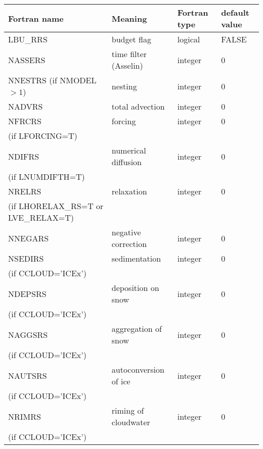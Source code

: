 \begin{center}
\begin{tabular} {|p{8cm}|p{4cm}|>{\centering}p{1.5cm}|p{1.5cm}<{\centering}|}
\hline
Fortran name & Meaning & Fortran type & default value \\
\hline\hline
LBU\_RRS & budget flag & logical & FALSE\index{LBU\_RRS!\innam{NAM\_BU\_RRS}} \\\hline
NASSERS  & time filter (Asselin)   & integer  &  0 \index{NASSERS!\innam{NAM\_BU\_RRS}} \\\hline
NNESTRS (if NMODEL$>1$) & nesting           & integer  &  0 \index{NNESTRS!\innam{NAM\_BU\_RRS}} \\\hline
NADVRS   & total advection   & integer  &  0 \index{NADVRS!\innam{NAM\_BU\_RTH}}\\\hline
NFRCRS   & forcing           & integer  &  0 \index{NFRCRS!\innam{NAM\_BU\_RRS}} \\
(if LFORCING=T) &  &   &   \\\hline
NDIFRS   & numerical diffusion & integer  &  0 \index{NDIFRS!\innam{NAM\_BU\_RRS}} \\
(if LNUMDIFTH=T) &  &   &   \\\hline
NRELRS   & relaxation        & integer  &  0 \index{NRELRS!\innam{NAM\_BU\_RRS}}\\
(if LHORELAX\_RS=T or LVE\_RELAX=T) &  &   &   \\\hline
NNEGARS  & negative correction & integer  &  0 \index{NNEGARS!\innam{NAM\_BU\_RRS}}\\\hline
NSEDIRS  & sedimentation & integer  &  0 \index{NSEDIRS!\innam{NAM\_BU\_RRS}}\\
(if CCLOUD='ICEx') & &   &  \\\hline
NDEPSRS  & deposition on snow & integer  &  0 \index{NDEPSRS!\innam{NAM\_BU\_RRS}}\\
(if CCLOUD='ICEx') & &   &  \\\hline
NAGGSRS  & aggregation of snow    & integer  &  0 \index{NAGGSRS!\innam{NAM\_BU\_RRS}}\\
(if CCLOUD='ICEx') & &   &  \\\hline
NAUTSRS  & autoconversion of ice   & integer  &  0 \index{NAUTSRS!\innam{NAM\_BU\_RRS}}\\
(if CCLOUD='ICEx') & &   &  \\\hline
NRIMRS   & riming of cloudwater    & integer  &  0 \index{NRIMRS!\innam{NAM\_BU\_RRS}}\\
(if CCLOUD='ICEx') & &   &  \\\hline

\end{tabular}
\end{center}
